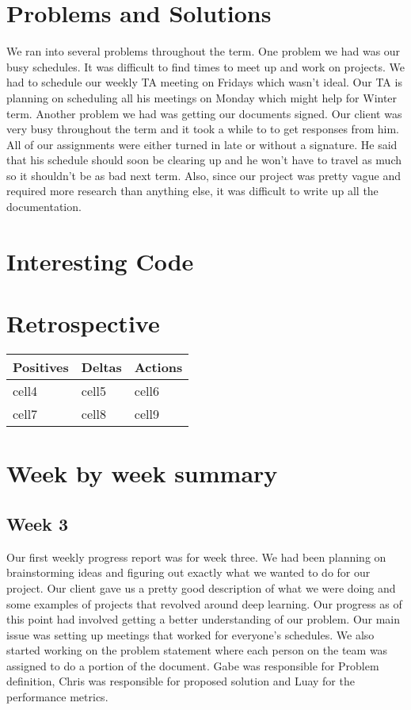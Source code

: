 \documentclass[onecolumn, draftclsnofoot,10pt, compsoc]{IEEEtran}
\begin{document}
\section{Problems and Solutions}
We ran into several problems throughout the term.
One problem we had was our busy schedules.
It was difficult to find times to meet up and work on projects.
We had to schedule our weekly TA meeting on Fridays which wasn't ideal.
Our TA is planning on scheduling all his meetings on Monday which might help for Winter term.
Another problem we had was getting our documents signed.
Our client was very busy throughout the term and it took a while to to get responses from him.
All of our assignments were either turned in late or without a signature.
He said that his schedule should soon be clearing up and he won't have to travel as much so it shouldn't be as bad next term.
Also, since our project was pretty vague and required more research than anything else, it was difficult to write up all the documentation.

\section{Interesting Code}
\section{Retrospective}

\begin{center}
\begin{tabu} to 0.9\linewidth{ || X[l] | X[c] | X[r] || }
	\hline
	Positives & Deltas & Actions \\
	\hline\hline
	cell4 & cell5 & cell6 \\
	cell7 & cell8 & cell9 \\
	\hline
\end{tabu}
\end{center}

\section{Week by week summary}

\subsection{Week 3}
Our first weekly progress report was for week three.
We had been planning on brainstorming ideas and figuring out exactly what we wanted to do for our project.
Our client gave us a pretty good description of what we were doing and some examples of projects that revolved around deep learning.
Our progress as of this point had involved getting a better understanding of our problem.
Our main issue was setting up meetings that worked for everyone's schedules.
We also started working on the problem statement where each person on the team was assigned to do a portion of the document.
Gabe was responsible for Problem definition, Chris was responsible for proposed solution and Luay for the performance metrics.
\end{document}
